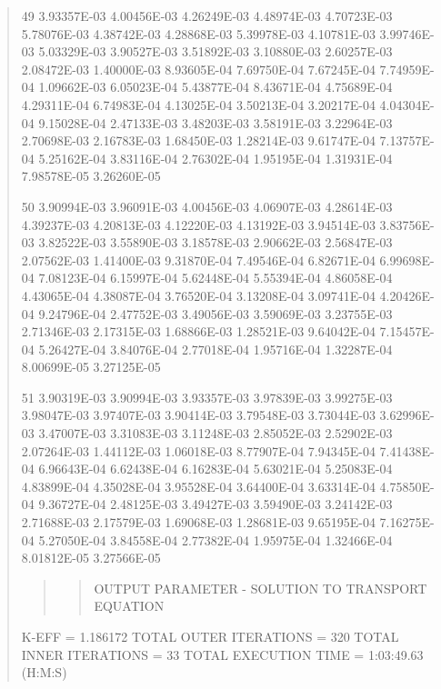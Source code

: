 \documentclass[letterpaper,10pt,english]{sphinxmanual}
\begin{document}
\begin{quote}
\begin{DUlineblock}{0em}
\item[] 49   3.93357E-03  4.00456E-03  4.26249E-03  4.48974E-03  4.70723E-03  5.78076E-03  4.38742E-03  4.28868E-03  5.39978E-03  4.10781E-03  3.99746E-03  5.03329E-03  3.90527E-03  3.51892E-03  3.10880E-03  2.60257E-03  2.08472E-03  1.40000E-03  8.93605E-04  7.69750E-04  7.67245E-04  7.74959E-04  1.09662E-03  6.05023E-04  5.43877E-04  8.43671E-04  4.75689E-04  4.29311E-04  6.74983E-04  4.13025E-04  3.50213E-04  3.20217E-04  4.04304E-04  9.15028E-04  2.47133E-03  3.48203E-03  3.58191E-03  3.22964E-03  2.70698E-03  2.16783E-03  1.68450E-03  1.28214E-03  9.61747E-04  7.13757E-04  5.25162E-04  3.83116E-04  2.76302E-04  1.95195E-04  1.31931E-04  7.98578E-05  3.26260E-05
\item[] 50   3.90994E-03  3.96091E-03  4.00456E-03  4.06907E-03  4.28614E-03  4.39237E-03  4.20813E-03  4.12220E-03  4.13192E-03  3.94514E-03  3.83756E-03  3.82522E-03  3.55890E-03  3.18578E-03  2.90662E-03  2.56847E-03  2.07562E-03  1.41400E-03  9.31870E-04  7.49546E-04  6.82671E-04  6.99698E-04  7.08123E-04  6.15997E-04  5.62448E-04  5.55394E-04  4.86058E-04  4.43065E-04  4.38087E-04  3.76520E-04  3.13208E-04  3.09741E-04  4.20426E-04  9.24796E-04  2.47752E-03  3.49056E-03  3.59069E-03  3.23755E-03  2.71346E-03  2.17315E-03  1.68866E-03  1.28521E-03  9.64042E-04  7.15457E-04  5.26427E-04  3.84076E-04  2.77018E-04  1.95716E-04  1.32287E-04  8.00699E-05  3.27125E-05
\item[] 51   3.90319E-03  3.90994E-03  3.93357E-03  3.97839E-03  3.99275E-03  3.98047E-03  3.97407E-03  3.90414E-03  3.79548E-03  3.73044E-03  3.62996E-03  3.47007E-03  3.31083E-03  3.11248E-03  2.85052E-03  2.52902E-03  2.07264E-03  1.44112E-03  1.06018E-03  8.77907E-04  7.94345E-04  7.41438E-04  6.96643E-04  6.62438E-04  6.16283E-04  5.63021E-04  5.25083E-04  4.83899E-04  4.35028E-04  3.95528E-04  3.64400E-04  3.63314E-04  4.75850E-04  9.36727E-04  2.48125E-03  3.49427E-03  3.59490E-03  3.24142E-03  2.71688E-03  2.17579E-03  1.69068E-03  1.28681E-03  9.65195E-04  7.16275E-04  5.27050E-04  3.84558E-04  2.77382E-04  1.95975E-04  1.32466E-04  8.01812E-05  3.27566E-05
\end{DUlineblock}
\begin{quote}
\begin{quote}

OUTPUT  PARAMETER - SOLUTION  TO  TRANSPORT  EQUATION
\end{quote}
\end{quote}

K-EFF                    =      1.186172
TOTAL OUTER ITERATIONS   =           320
TOTAL INNER ITERATIONS   =            33
TOTAL EXECUTION TIME     =    1:03:49.63   (H:M:S)
\end{quote}
\end{document}
